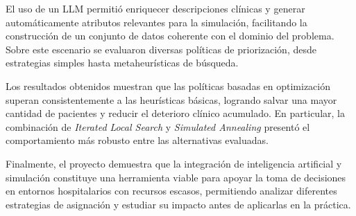 \documentclass[12pt,a4paper]{article}
\begin{document}
El uso de un LLM permitió enriquecer descripciones clínicas y generar automáticamente atributos relevantes para la simulación, 
facilitando la construcción de un conjunto de datos coherente con el dominio del problema. 
Sobre este escenario se evaluaron diversas políticas de priorización, desde estrategias simples hasta 
metaheurísticas de búsqueda.

Los resultados obtenidos muestran que las políticas basadas en optimización superan consistentemente a las heurísticas básicas, 
logrando salvar una mayor cantidad de pacientes y reducir el deterioro clínico acumulado. 
En particular, la combinación de \textit{Iterated Local Search} y \textit{Simulated Annealing} 
presentó el comportamiento más robusto entre las alternativas evaluadas.

Finalmente, el proyecto demuestra que la integración de inteligencia artificial y simulación constituye 
una herramienta viable para apoyar la toma de decisiones en entornos hospitalarios con recursos escasos, 
permitiendo analizar diferentes estrategias de asignación y estudiar su impacto antes de aplicarlas en la práctica.
\end{document}

